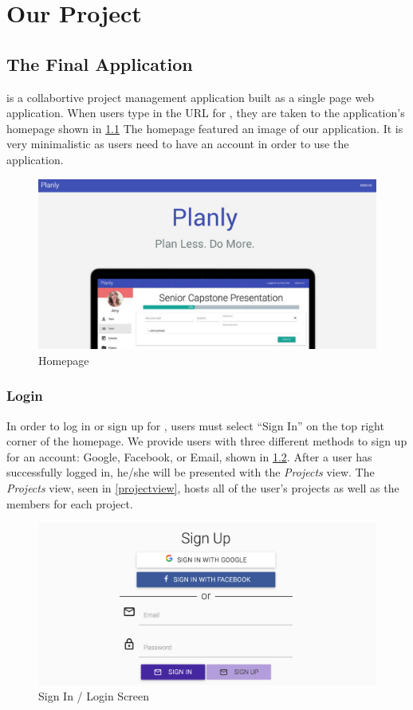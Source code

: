 \chapter{Our Project}

\section{The Final Application}
\projectTitle is a collabortive project management application built as a single page web application. When users type in the URL for \projectTitle, they are taken to the application's homepage shown in \ref{homepage} The homepage featured an image of our application. It is very minimalistic as users need to have an account in order to use the application.

\begin{figure}[ht]
\centering
\includegraphics[width=\textwidth]{figure41.png}
\caption{Homepage}
\label{homepage}
\end{figure}
\FloatBarrier

\subsection{Login}
In order to log in or sign up for \projectTitle, users must select ``Sign In'' on the top right corner of the homepage. We provide users with three different methods to sign up for an account: Google, Facebook, or Email, shown in \ref{signin}. After a user has successfully logged in, he/she will be presented with the \emph{Projects} view. The \emph{Projects} view, seen in \ref{projectview}, hosts all of the user's projects as well as the members for each project. 

\begin{figure}[ht]
\centering
\includegraphics[width=\textwidth]{figure42.png}
\caption{Sign In / Login Screen}
\label{signin}
\end{figure}
\FloatBarrier

